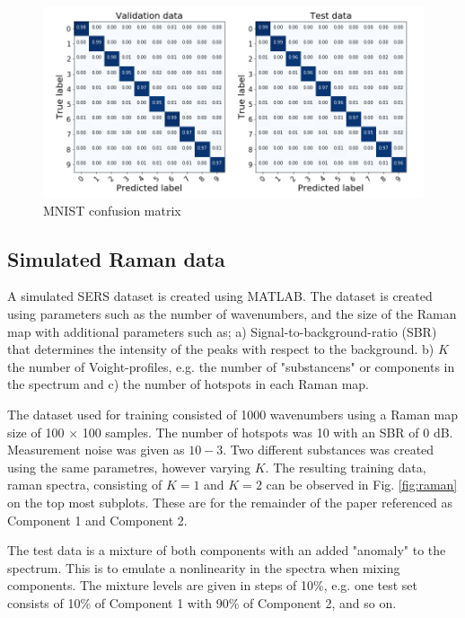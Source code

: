 \documentclass{article}
\begin{document}
\begin{figure}[H]
	\includegraphics[width=1\linewidth]{Confusion_matrix_fine_tune_2.png}  
	\caption{MNIST confusion matrix}
\end{figure}


\subsection{Simulated Raman data}
A simulated SERS dataset is created using MATLAB. The dataset is created using parameters such as the number of wavenumbers, and the size of the Raman map with additional parameters such as; a) Signal-to-background-ratio (SBR) that determines the intensity of the peaks with respect to the background. b) $K$ the number of Voight-profiles, e.g. the number of "substancens" or components in the spectrum and c) the number of hotspots in each Raman map.

The dataset used for training consisted of 1000 wavenumbers using a Raman map size of 100 $\times$ 100 samples. The number of hotspots was 10 with an SBR of 0 dB. Measurement noise was given as $10-3$. Two different substances was created using the same parametres, however varying $K$. The resulting training data, raman spectra, consisting of $K=1$ and $K=2$ can be observed in Fig. \ref{fig:raman} on the top most subplots. These are for the remainder of the paper referenced as Component 1 and Component 2.

The test data is a mixture of both components with an added "anomaly" to the spectrum. This is to emulate a nonlinearity in the spectra when mixing components. The mixture levels are given in steps of 10\%, e.g. one test set consists of 10\% of Component 1 with 90\% of Component 2, and so on. 
\end{document}
